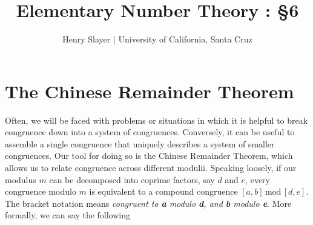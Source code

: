 \documentclass{article}
\newcommand{\X}[1]{\, \text{mod} \, #1}
\begin{document}
 

\title{Elementary Number Theory : \S6 } 
\author{Henry Slayer $|$ University of California, Santa Cruz} 
\date{}
\maketitle

\section*{The Chinese Remainder Theorem} 
Often, we will be faced with problems or situations in which it is helpful to break congruence down into a system of congruences. Conversely, it can be useful to assemble a single congruence that uniquely describes a system of smaller congruences. Our tool for doing so is the Chinese Remainder Theorem, which allows us to relate congruence across different modulii. Speaking loosely, if our modulus $m$ can be decomposed into coprime factors, say $d$ and $e$, every congruence modulo $m$ is equivalent to a compound congruence $[a, b]\X{[d, e]}$. The bracket notation means \textit{congruent to \textbf{a} modulo \textbf{d}, and \textbf{b} modulo \textbf{e}}. More formally, we can say the following 
\end{document}

